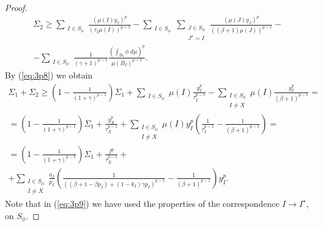 \documentclass{article}
\numberwithin{equation}{section}
\theoremstyle{definition}
\theoremstyle{remark}
\begin{document}
\begin{proof}
\begin{multline} \label{eq:3p8}
\Sigma_2\geq \sum_{\substack{I\in S_\phi}}\frac{\left( \mu(I)y_I \right)^p}{\left( \tau_I \mu(I) \right)^{p-1}}- \sum_{\substack{I\in S_\phi}}\sum_{\substack{J\in S_\phi \\ J^\star=I\ }}\frac{\left( \mu(J)y_J \right)^p}{\left( (\beta +1)\mu(J) \right)^{p-1}}-\\
-\sum_{\substack{I\in S_\phi}}\frac{1}{(\gamma+1)^{p-1}} \frac{\left( \int_{B_I}\phi\; d\mu \right)^p}{\mu(B_I)^{p-1}}.
\end{multline}
By (\ref{eq:3p8}) we obtain
\begin{multline} \label{eq:3p9}
\Sigma_1+\Sigma_2\geq \left(1-\frac{1}{(1+\gamma)^{p-1}} \right)\Sigma_1+\sum_{\substack{I\in S_\phi}}\mu(I) \frac{y_I^p}{\tau_I^{p-1}}-\sum_{\substack{I\in S_\phi \\ I\neq X}} \mu(I) \frac{y_I^p}{(\beta+1)^{p-1}}=\\
=\left(1-\frac{1}{(1+\gamma)^{p-1}} \right)\Sigma_1+\frac{y_X^p}{\tau_X^{p-1}}+\sum_{\substack{I\in S_\phi \\ I\neq X}}\mu(I) y_I^p \left( \frac{1}{\tau_I^{p-1}}-\frac{1}{(\beta+1)^{p-1}} \right)=\\
=\left(1-\frac{1}{(1+\gamma)^{p-1}} \right)\Sigma_1+\frac{f^p}{\tau_X^{p-1}}+\\
+\sum_{\substack{I\in S_\phi \\ I\neq X}} \frac{a_I}{p_I} \left( \frac{1}{\left((\beta +1-\beta p_I)+(1-k_I)\gamma p_I\right)^{p-1}} - \frac{1}{(\beta +1)^{p-1}} \right) y_I^p.
\end{multline}
Note that in (\ref{eq:3p9}) we have used the properties of the correspondence $I\longrightarrow I^{\star}$, on $S_{\phi}$.


\end{proof}
\end{document}
